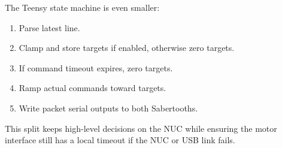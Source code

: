 The Teensy state machine is even smaller:

\begin{enumerate}
  \item Parse latest  line.
  \item Clamp and store targets if enabled, otherwise zero targets.
  \item If command timeout expires, zero targets.
  \item Ramp actual commands toward targets.
  \item Write packet serial outputs to both Sabertooths.
\end{enumerate}

This split keeps high-level decisions on the NUC while ensuring the motor interface still has a local timeout if the NUC or USB link fails.
